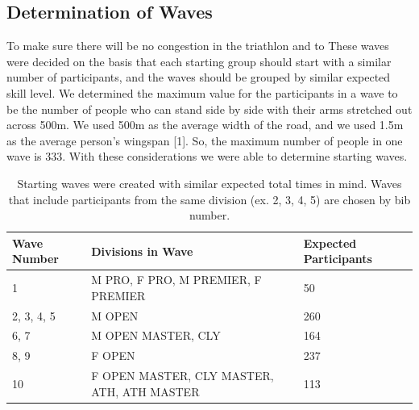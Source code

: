 \documentclass[12pt]{article}
\begin{document}
\subsection{Determination of Waves}
To make sure there will be no congestion in the triathlon and to  These waves were decided on the basis that each starting group should start with a similar number of participants, and the waves should be grouped by similar expected skill level. We determined the maximum value for the participants in a wave to be the number of people who can stand side by side with their arms stretched out across 500m. We used 500m as the average width of the road, and we used 1.5m as the average person's wingspan [1]. So, the maximum number of people in one wave is 333.  With these considerations we were able to determine starting waves. 
\begin{table}[H]
\centering
\label{my-label}
\begin{tabular}{|l|l|l|}\hline
\textbf{Wave Number} & \textbf{Divisions in Wave}             & \textbf{Expected Participants}\\\hline
1      & M PRO, F PRO, M PREMIER, F PREMIER     & 50\\\hline
2, 3, 4, 5 & M OPEN                   & 260\\\hline
6, 7    & M OPEN MASTER, CLY             & 164\\\hline
8, 9    & F OPEN                   & 237\\\hline
10     & F OPEN MASTER, CLY MASTER, ATH, ATH MASTER & 113\\ \hline   
\end{tabular}
\caption{Starting waves were created with similar expected total times in mind. Waves that include participants from the same division (ex. 2, 3, 4, 5) are chosen by bib number.}
\end{table}
\end{document}
